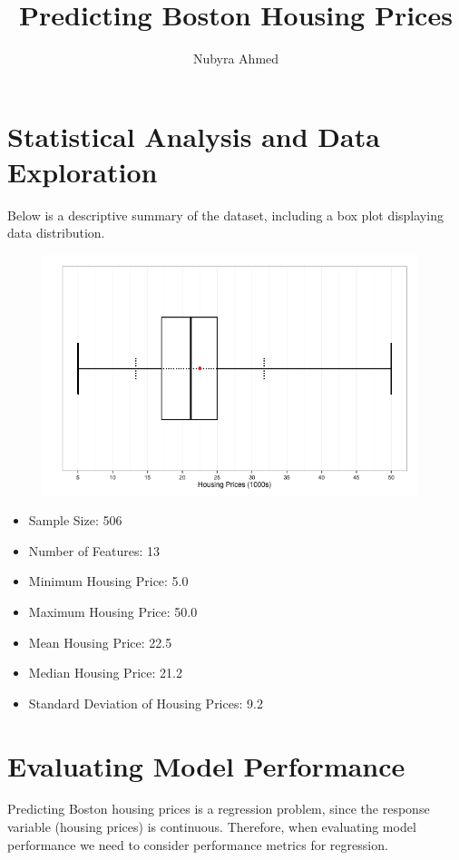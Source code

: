 \documentclass[12pt, letterpaper]{article}
\begin{document}
\title{Predicting Boston Housing Prices}
\author{Nubyra Ahmed}
\maketitle 

\section{Statistical Analysis and Data Exploration}

Below is a descriptive summary of the dataset, including a box plot displaying data distribution.\\

\begin{center}
\includegraphics[width=13cm,height=7cm]{boxplot}
\end{center}

\begin{itemize}
\item Sample Size: 506
\item Number of Features: 13
\item Minimum Housing Price: 5.0
\item Maximum Housing Price: 50.0
\item Mean Housing Price: 22.5
\item Median Housing Price: 21.2
\item Standard Deviation of Housing Prices: 9.2
\end{itemize}

\section{Evaluating Model Performance}

Predicting Boston housing prices is a regression problem, since the response variable (housing prices) is continuous. Therefore, when evaluating model performance we need to consider performance metrics for regression. 
\end{document}
